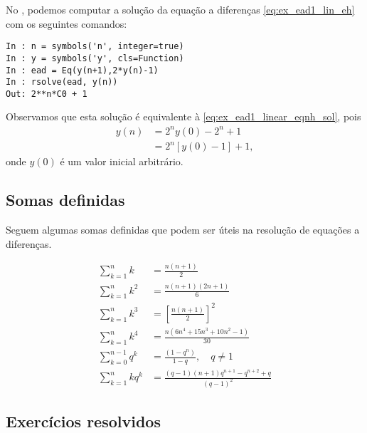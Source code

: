 \begin{ex}
  \ifispython
  No \python, podemos computar a solução da equação a diferenças \eqref{eq:ex_ead1_lin_eh} com os seguintes comandos:
\begin{verbatim}
In : n = symbols('n', integer=true)
In : y = symbols('y', cls=Function)
In : ead = Eq(y(n+1),2*y(n)-1)
In : rsolve(ead, y(n))
Out: 2**n*C0 + 1
\end{verbatim}
  Observamos que esta solução é equivalente à \eqref{eq:ex_ead1_linear_eqnh_sol}, pois
  \begin{align}
    y(n) &= 2^ny(0) - 2^{n} + 1 \\
         &= 2^n\left[y(0)-1\right]+1,
  \end{align}
  onde $y(0)$ é um valor inicial arbitrário.
  \fi
\end{ex}

\subsection{Somas definidas}\label{cap_ead1_sec_eqlin_subsec_sd}

Seguem algumas somas definidas que podem ser úteis na resolução de equações a diferenças.

\begin{align}
  \sum_{k=1}^{n} k &= \frac{n(n+1)}{2}\\
  \sum_{k=1}^{n} k^2 &= \frac{n(n+1)(2n+1)}{6}\\
  \sum_{k=1}^n k^3 &= \left[\frac{n(n+1)}{2}\right]^2\\
  \sum_{k=1}^n k^4 &= \frac{n(6n^4+15n^3+10n^2-1)}{30}\\
  \sum_{k=0}^{n-1}q^k &= \frac{(1-q^n)}{1-q},\quad q\neq 1\\
  \sum_{k=1}^n kq^k &= \frac{(q-1)(n+1)q^{n+1}-q^{n+2}+q}{(q-1)^2}
\end{align}

\subsection*{Exercícios resolvidos}

